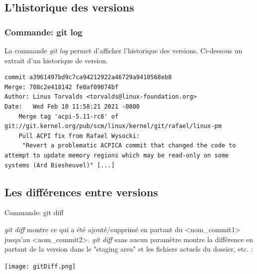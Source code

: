 \documentclass{beamer}
\begin{document}
\subsection{L'historique des versions}
\begin{frame}[fragile]
\frametitle{Commande: git log}

La commande \textit{git log} permet d'afficher l'historique des versions. Ci-dessous un extrait d'un historique de version.
\begin{mdframed}[style=Bash]
    \begin{lstlisting}[style=Bash, caption={Exemple de bon message de commit}]
commit a3961497bd9c7ca94212922a46729a9410568eb8
Merge: 708c2e418142 fe0af09074bf
Author: Linus Torvalds <torvalds@linux-foundation.org>
Date:   Wed Feb 10 11:58:21 2021 -0800
    Merge tag 'acpi-5.11-rc8' of git://git.kernel.org/pub/scm/linux/kernel/git/rafael/linux-pm
    Pull ACPI fix from Rafael Wysocki:
     "Revert a problematic ACPICA commit that changed the code to attempt to update memory regions which may be read-only on some systems (Ard Biesheuvel)" [...]
    \end{lstlisting}
\end{mdframed}
\end{frame}

\subsection{Les différences entre versions}
\begin{frame}{Commande: git diff}

\textit{git diff} montre ce qui a été ajouté/supprimé en partant du <nom\_commit1> jusqu'au <nom\_commit2>. \textit{git diff} sans aucun paramètre montre la différence en partant de la version dans le "staging area" et les fichiers actuels du dossier, etc. : 
\begin{center}
	\texttt{[image: gitDiff.png]}
\end{center}
\end{frame}


\end{document}

